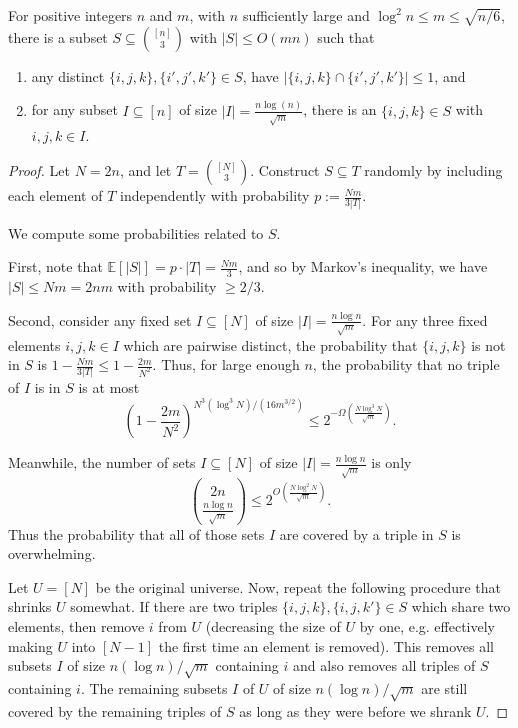 \documentclass{theoretics}
\newcommand{\E}{\mathbb{E}}
\begin{document}
\begin{theorem} \label{thm:opt2}
For positive integers $n$ and $m$, with $n$ sufficiently large and $\log^2 n \leq m\leq \sqrt{n/6}$, there is a subset $S \subseteq \binom{[n]}{3}$ with $|S|\leq O(mn)$ such that
\begin{enumerate}[(1)]
    \item any distinct $\{i,j,k\},\{i',j',k'\} \in S$, have $|\{i,j,k\} \cap \{i',j',k'\}| \leq 1$, and
    \item for any subset $I \subseteq [n]$ of size $|I| = \frac{n \log (n)}{\sqrt{m}}$, there is an $\{i,j,k\} \in S$ with $i,j,k \in I$. 
\end{enumerate}
\end{theorem}

\begin{proof}
Let $N=2n$, and let $T = \binom{[N]}{3}$. Construct $S \subseteq T$ randomly by including each element of $T$ independently with probability $p := \frac{Nm}{3|T|}$. 

We compute some probabilities related to $S$.

First, note that $\E[|S|] = p \cdot |T| = \frac{Nm}{3}$, and so by Markov's inequality, we have $|S| \leq Nm=2nm$ with probability $\geq 2/3$.


Second, consider any fixed set $I \subseteq [N]$ of size $|I| = \frac{n \log n}{\sqrt{m}}$. 
For any three fixed elements $i,j,k\in I$ which are pairwise distinct, the probability that $\{i,j,k\}$ is not in $S$ is $1-\frac{Nm}{3|T|}\leq 1-\frac{2m}{N^2}$. Thus, for large enough $n$, the probability that no triple of $I$ is in $S$ is at most $$\left(1-\frac{2m}{N^2}\right)^{N^3(\log^3 N)/(16m^{3/2})}\leq 2^{-\Omega(\frac{N\log^3 N}{\sqrt{m}})}.$$

Meanwhile, the number of sets  $I \subseteq [N]$ of size $|I| = \frac{n \log n}{\sqrt{m}}$ is only
$$\binom{2n}{\frac{n \log n}{\sqrt{m}}} \leq  2^{O(\frac{N \log^2 N}{\sqrt{m}})}.$$
Thus the probability that all of those sets $I$ are covered by a triple in $S$ is overwhelming.

Let $U=[N]$ be the original universe.
Now, repeat the following procedure that shrinks $U$ somewhat. If there are two triples $\{i,j,k\},\{i,j,k'\} \in S$ which share two elements, then remove $i$ from $U$ (decreasing the size of $U$ by one, e.g. effectively making $U$ into $[N-1]$ the first time an element is removed).
This removes all subsets $I$ of size $n(\log n)/\sqrt m$ containing $i$ and also removes all triples of $S$ containing $i$.
The remaining subsets $I$ of $U$ of size $n(\log n)/\sqrt m$ are still covered by the remaining triples of $S$ as long as they were before we shrank $U$.


\end{proof}
\end{document}
